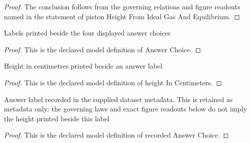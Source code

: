 \begin{proof}
  The conclusion follows from the governing relations and figure readouts named in the statement of piston Height From Ideal Gas And Equilibrium.
\end{proof}
\begin{definition}
  \label{def:physics:phyx-mini-0374:phyxminiproblems-problemphyxmini0374-answerchoice}
  Labels printed beside the four displayed answer choices
\end{definition}
\begin{proof}
  This is the declared model definition of Answer Choice.
\end{proof}
\begin{definition}
  \label{def:physics:phyx-mini-0374:phyxminiproblems-problemphyxmini0374-answerchoice-heightincentimeters}
  Height in centimetres printed beside an answer label
\end{definition}
\begin{proof}
  This is the declared model definition of height In Centimeters.
\end{proof}
\begin{definition}
  \label{def:physics:phyx-mini-0374:phyxminiproblems-problemphyxmini0374-recordedanswerchoice}
  Answer label recorded in the supplied dataset metadata. This is retained as metadata only: the governing laws and exact figure readouts below do not imply the height printed beside this label
\end{definition}
\begin{proof}
  This is the declared model definition of recorded Answer Choice.
\end{proof}
